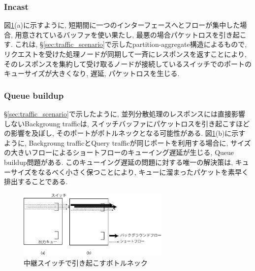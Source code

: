 \documentclass[11pt, a4paper, twocolumn]{jsarticle}
\begin{document}
\subsubsection{Incast}
\label{subsec:incast}
図\ref{fig:impair}(a)に示すように, 短期間に一つのインターフェースへとフローが集中した場合, 用意されているバッファを使い果たし,
最悪の場合パケットロスを引き起こす.
これは, \S \ref{sec:traffic_scenario}で示したpartition-aggregate構造によるもので,
リクエストを受けた処理ノードが同期して一斉にレスポンスを返すことにより,
そのレスポンスを集約して受け取るノードが接続しているスイッチでのポートのキューサイズが大きくなり, 遅延, パケットロスを生じる.

\subsubsection{Queue buildup}
\label{subsec:queue}
\S \ref{sec:traffic_scenario}で示したように, 並列分散処理のレスポンスには直接影響しないBackgroung trafficは,
スイッチバッファにパケットロスを引き起こすほどの影響を及ぼし, そのポートがボトルネックとなる可能性がある.
図\ref{fig:impair}(b)に示すように, Backgroung trafficとQuery trafficが同じポートを利用する場合に,
サイズの大きいフローによるショートフローのキューイング遅延が生じる, Queue buildup問題がある.
このキューイング遅延の問題に対する唯一の解決策は, キューサイズをなるべく小さく保つことにより, キューに溜まったパケットを素早く排出することである.

\begin{figure}[h]
    \begin{center}
    \includegraphics[autoebb, width=210pt]{./img/impairments.pdf}
    \caption{中継スイッチで引き起こすボトルネック}
    \label{fig:impair}
    \end{center}
\end{figure}
\end{document}
